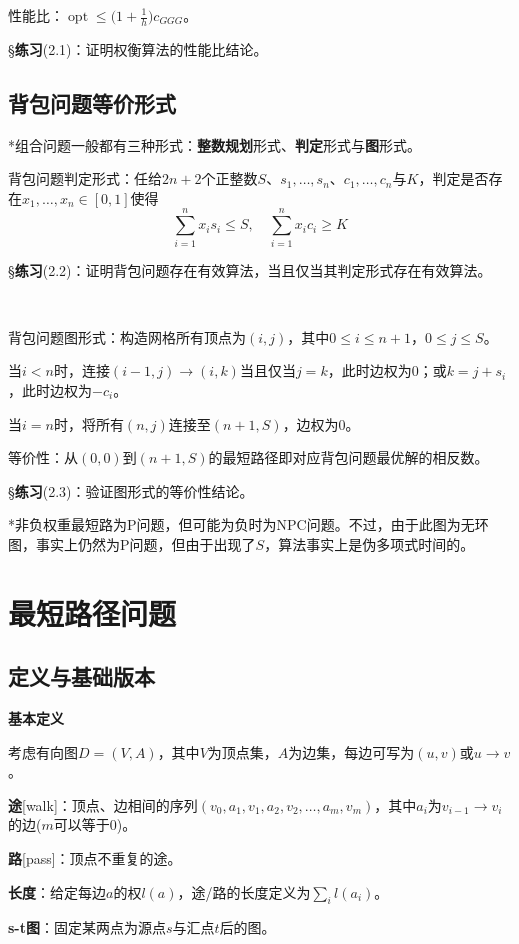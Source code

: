 \documentclass[a4paper,UTF8,fontset=windows]{ctexart}
\newcommand{\exce}[2]{\S\textbf{练习}(#1)：{\kaishu #2}}
\DeclareMathOperator*{\opt}{opt}
\begin{document}
性能比：$\opt\le\big(1+\frac{1}{h}\big)c_{GGG}$。

\exce{2.1}{证明权衡算法的性能比结论。}

\subsection{背包问题等价形式}

*组合问题一般都有三种形式：\textbf{整数规划}形式、\textbf{判定}形式与\textbf{图}形式。

背包问题判定形式：任给$2n+2$个正整数$S$、$s_1,\dots,s_n$、$c_1,\dots,c_n$与$K$，判定是否存在$x_1,\dots,x_n\in[0,1]$使得
$$\sum_{i=1}^nx_is_i\le S,\quad \sum_{i=1}^nx_ic_i\ge K$$

\exce{2.2}{证明背包问题存在有效算法，当且仅当其判定形式存在有效算法。}

\

背包问题图形式：构造网格所有顶点为$(i,j)$，其中$0\le i\le n+1$，$0\le j\le S$。

当$i<n$时，连接$(i-1,j)\to(i,k)$当且仅当$j=k$，此时边权为0；或$k=j+s_i$，此时边权为$-c_i$。

当$i=n$时，将所有$(n,j)$连接至$(n+1,S)$，边权为0。

等价性：从$(0,0)$到$(n+1,S)$的最短路径即对应背包问题最优解的相反数。

\exce{2.3}{验证图形式的等价性结论。}

*非负权重最短路为P问题，但可能为负时为NPC问题。不过，由于此图为无环图，事实上仍然为P问题，但由于出现了$S$，算法事实上是伪多项式时间的。

\section{最短路径问题}
\subsection{定义与基础版本}
\textbf{基本定义}

考虑有向图$D=(V,A)$，其中$V$为顶点集，$A$为边集，每边可写为$(u,v)$或$u\to v$。

\textbf{途}[walk]：顶点、边相间的序列$(v_0,a_1,v_1,a_2,v_2,\dots,a_m,v_m)$，其中$a_i$为$v_{i-1}\to v_i$的边($m$可以等于0)。

\textbf{路}[pass]：顶点不重复的途。

\textbf{长度}：给定每边$a$的权$l(a)$，途/路的长度定义为$\sum_il(a_i)$。

\textbf{s-t图}：固定某两点为源点$s$与汇点$t$后的图。
\end{document}
